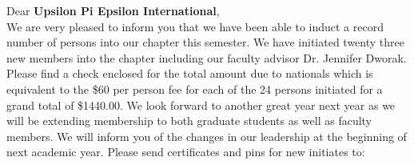\documentclass{letter}
\begin{document}
Dear \textbf{Upsilon Pi Epsilon International},  \\ 

\indent We are very pleased to inform you that we have been able to induct a record number of persons into our chapter this semester. We have initiated twenty three new members into the chapter including our faculty advisor Dr. Jennifer Dworak. Please find a check enclosed for the total amount due to nationals which is equivalent to the \$60 per person fee for each of the 24 persons initiated for a grand total of \$1440.00. We look forward to another great year next year as we will be extending membership to both graduate students as well as faculty members. We will inform you of the changes in our leadership at the beginning of next academic year. Please send certificates and pins for new initiates to:
\end{document}
